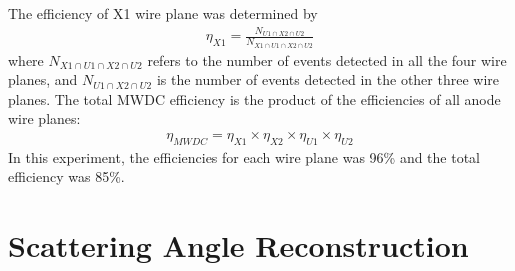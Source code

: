 The efficiency of X1 wire plane was determined by
\begin{equation}
    \label{eq:efficiency}
    \begin{aligned}
    \eta_{X1} = \frac{N_{U1\cap X2\cap U2}}{N_{X1 \cap U1 \cap X2\cap U2}}
    \end{aligned}
\end{equation}
where $N_{X1 \cap U1 \cap X2\cap U2}$ refers to the number of events detected in all the four wire planes, and $N_{U1\cap X2\cap U2}$ is the number of events detected in the other three wire planes. The total MWDC efficiency is the product of the efficiencies of all anode wire planes:
\begin{equation}
    \label{eq:efficiency}
    \begin{aligned}
    \eta_{MWDC} = \eta_{X1} \times \eta_{X2} \times \eta_{U1} \times \eta_{U2}
    \end{aligned}
\end{equation}
In this experiment, the efficiencies for each wire plane was 96\% and the total efficiency was 85\%.



\section{Scattering Angle Reconstruction}


